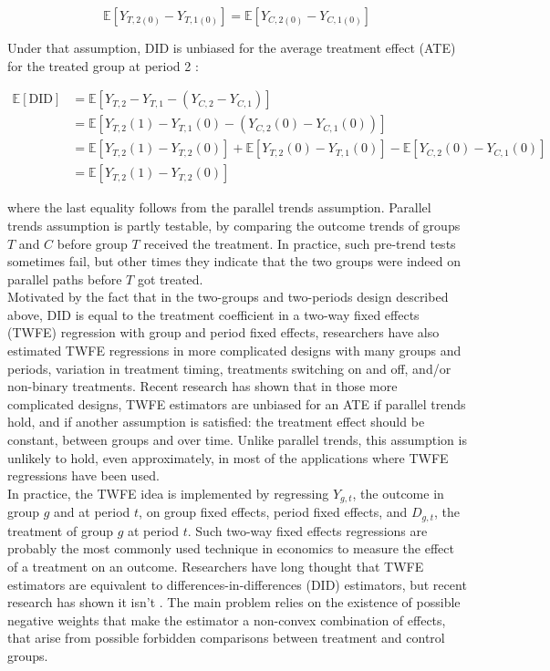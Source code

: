 \documentclass[10pt, oneside]{book}
\begin{document}
$$ \mathbb{E}[Y_{T,2(0)} - Y_{T,1(0)}] = \mathbb{E}[Y_{C,2(0)} - Y_{C,1(0)}]$$

Under that assumption, DID is unbiased for the average treatment effect (ATE) for the treated group at period 2 \citep{abadie2005semiparametric}:  

\begin{equation}
\begin{aligned}
\mathbb{E}[\text{DID}] &= \mathbb{E}[Y_{T,2} - Y_{T,1} - (Y_{C,2} - Y_{C,1})] \\
&= \mathbb{E}[Y_{T,2}(1) - Y_{T,1}(0) - (Y_{C,2}(0) - Y_{C,1}(0))] \\
&= \mathbb{E}[Y_{T,2}(1) - Y_{T,2}(0)] + \mathbb{E}[Y_{T,2}(0) - Y_{T,1}(0)] - \mathbb{E}[Y_{C,2}(0) - Y_{C,1}(0)] \\
&= \mathbb{E}[Y_{T,2}(1) - Y_{T,2}(0)]
\end{aligned}
\end{equation}

where the last equality follows from the parallel trends assumption. Parallel trends assumption is partly testable, by comparing the outcome trends of groups $T$ and $C$ before group $T$ received the treatment. In practice, such pre-trend tests sometimes fail, but other times they indicate that the two groups were indeed on parallel paths before $T$ got treated. \\

Motivated by the fact that in the two-groups and two-periods design described above, DID is equal to the treatment coefficient in a two-way fixed effects (TWFE) regression with group and period fixed effects, researchers have also estimated TWFE regressions in more complicated designs with many groups and periods, variation in treatment timing, treatments switching on and off, and/or non-binary treatments. Recent research has shown that in those more complicated designs, TWFE estimators are unbiased for an ATE if parallel trends hold, and if another assumption is satisfied: the treatment effect should be constant, between groups and over time. Unlike parallel trends, this assumption is unlikely to hold, even approximately, in most of the applications where TWFE regressions have been used. \\

In practice, the TWFE idea is implemented by regressing $Y_{g,t}$, the outcome in group $g$ and at period $t$, on group fixed effects, period fixed effects, and $D_{g,t}$, the treatment of group $g$ at period $t$. Such two-way fixed effects regressions are probably the most commonly used technique in economics to measure the effect of a treatment on an outcome. Researchers have long thought that TWFE estimators are equivalent to differences-in-differences (DID) estimators, but recent research has shown it isn't \citep{DID_survey}. The main problem relies on the existence of possible negative weights that make the estimator a non-convex combination of effects, that arise from possible forbidden comparisons between treatment and control groups. \\
\end{document}
